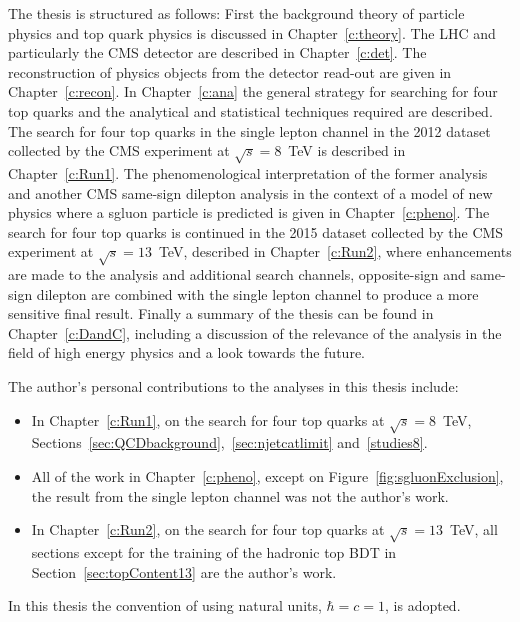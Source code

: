 The thesis is structured as follows: First the background theory of particle physics and top quark physics is discussed in Chapter~\ref{c:theory}. The LHC and particularly the CMS detector are described in Chapter~\ref{c:det}. The reconstruction of physics objects from the detector read-out are given in Chapter~\ref{c:recon}. In Chapter~\ref{c:ana} the general strategy for searching for four top quarks and the analytical and statistical techniques required are described. The search for four top quarks in the single lepton channel in the 2012 dataset collected by the CMS experiment at $\sqrt{s}=8$~TeV is described in Chapter~\ref{c:Run1}. The phenomenological interpretation of the former analysis and another CMS same-sign dilepton analysis in the context of a model of new physics where a sgluon particle is predicted is given in Chapter~\ref{c:pheno}. The search for four top quarks is continued in the 2015 dataset collected by the CMS experiment at $\sqrt{s}=13$~TeV, described in Chapter~\ref{c:Run2}, where enhancements are made to the analysis and additional search channels, opposite-sign and same-sign dilepton are combined with the single lepton channel to produce a more sensitive final result. Finally a summary of the thesis can be found in Chapter~\ref{c:DandC}, including a discussion of the relevance of the analysis in the field of high energy physics and a look towards the future.

The author's personal contributions to the analyses in this thesis include: 
\begin{itemize}
\item In Chapter~\ref{c:Run1}, on the search for four top quarks at $\sqrt{s}=8$~TeV, Sections~\ref{sec:QCDbackground},~\ref{sec:njetcatlimit} and~\ref{studies8}.
\item All of the work in Chapter~\ref{c:pheno}, except on Figure~\ref{fig:sgluonExclusion}, the result from the single lepton channel was not the author's work.
\item In Chapter~\ref{c:Run2}, on the search for four top quarks at $\sqrt{s}=13$~TeV, all sections except for the training of the hadronic top BDT in Section~\ref{sec:topContent13} are the author's work.
\end{itemize}


In this thesis the convention of using natural units, $\hbar = c = 1$, is adopted. 
